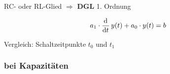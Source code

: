 \begin{frame}
{\begin{minipage}{0.48\textwidth}
    \vspace{1em}
    RC- oder RL-Glied $\Longrightarrow$ \textbf{DGL} 1. Ordnung

    \begin{equation*}
        a_1 \cdot \frac{\mathrm{d}^{{}}}{\mathrm{d}t^{{}}}\, y(t) + a_0 \cdot y(t) = b
    \end{equation*}
\end{minipage}%
\begin{minipage}{0.48\textwidth}\centering
    \pause
    Vergleich: Schaltzeitpunkte $t_0$ und $t_1$
\end{minipage}
}%
\end{frame}

\subsubsection{bei Kapazitäten}
\label{sec:schaltvorgaengezeitbereich:ac:c}

